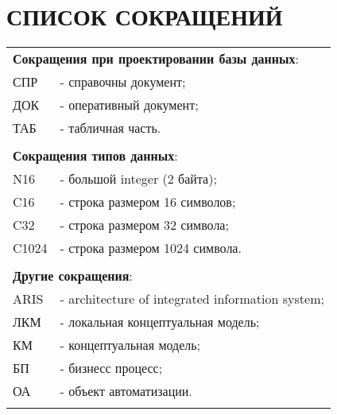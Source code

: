 {}
\section*{СПИСОК СОКРАЩЕНИЙ}

\begin{tabular}{ll}
    \multicolumn{2}{l}{\textbf{Сокращения при проектировании базы данных}:}\\
    СПР  & - справочны документ; \\
    ДОК  & - оперативный документ; \\
    ТАБ  & - табличная часть. \\
    &\\
    \multicolumn{2}{l}{\textbf{Сокращения типов данных}:}\\
    N16  & - большой integer (2 байта); \\
    C16  & - строка размером 16 символов; \\
    C32  & - строка размером 32 символа; \\
    C1024  & - строка размером 1024 символа. \\
    &\\
    \multicolumn{2}{l}{\textbf{Другие сокращения}:}\\
    ARIS & - architecture of integrated information system;\\
    ЛКМ  & - локальная концептуальная модель;\\ 
    КМ   & - концептуальная модель;\\
    БП   & - бизнесс процесс;\\
    ОА   & - объект автоматизации.\\
    &\\
\end{tabular}

\newpage
